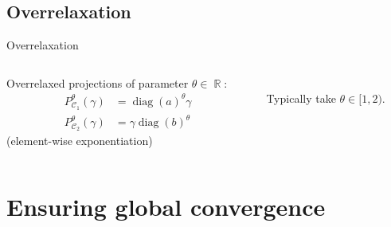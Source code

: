 \documentclass[compress]{beamer}
\DeclareMathOperator{\IR}{\mathbb{R}}
\DeclareMathOperator{\Ccal}{\mathcal{C}}
\DeclareMathOperator{\diag}{diag}
\begin{document}
\subsection{Overrelaxation}
\begin{frame}{Overrelaxation}
	\begin{columns}
		\begin{column}{0.6\textwidth}
			Overrelaxed projections of parameter $\theta \in \IR$:
			\begin{align}\label{or_scaling}
			P_{\Ccal_1}^\theta(\gamma) &= \diag(a)^\theta \gamma\\
			P_{\Ccal_2}^\theta(\gamma) &= \gamma \diag(b)^\theta \nonumber
			\end{align}
			(element-wise exponentiation)
		\end{column}
		\begin{column}{0.4\textwidth}
			\centering
			\\
			Typically take $\theta \in [1,2)$.
		\end{column}
	\end{columns}
\end{frame}



\section{Ensuring global convergence}

\end{document}
